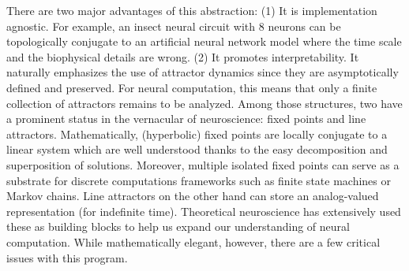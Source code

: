 \documentclass{article}
\theoremstyle{definition} \newtheorem{definition}{Definition}  \newtheorem{example}{Example}
\theoremstyle{remark} \newtheorem{remark}{Remark}
\newcounter{ct}
\begin{document}
There are two major advantages of this abstraction:
(1) It is implementation agnostic. For example, an insect neural circuit with 8 neurons can be topologically conjugate to an artificial neural network model where the time scale and the biophysical details are wrong.
(2) It promotes interpretability.
It naturally emphasizes the use of attractor dynamics since they are asymptotically defined and preserved.
For neural computation, this means that only a finite collection of attractors remains to be analyzed.
Among those structures, two have a prominent status in the vernacular of neuroscience: fixed points and line attractors.
Mathematically, (hyperbolic) fixed points are locally conjugate to a linear system\citep{hartman1960lemma} which are well understood thanks to the easy decomposition and superposition of solutions.
Moreover, multiple isolated fixed points can serve as a substrate for discrete computations frameworks such as finite state machines or Markov chains.
Line attractors on the other hand can store an analog-valued representation (for indefinite time).
Theoretical neuroscience  has extensively used these as building blocks to help us expand our understanding of neural computation\citep{dayan2005theoretical,vyas2020ctd}.
While mathematically elegant, however, there are a few critical issues with this program.
\end{document}
